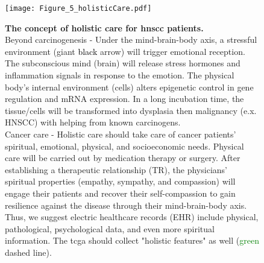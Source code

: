 \documentclass[12pt, a4paper]{article}
\newcommand{\bcaption}[2]{\caption{\textbf{#1} #2}}
\begin{document}
\begin{figure}[hp]
\centering
\texttt{[image: Figure\_5\_holisticCare.pdf]}
\bcaption{The concept of holistic care for \acrshort{hnscc} patients.}
{\\Beyond carcinogenesis - Under the mind-brain-body axis, a stressful environment (giant \textcolor{black}{black} arrow) will trigger emotional reception. The subconscious mind (brain) will release stress hormones and inflammation signals in response to the emotion. The physical body's internal environment (cells) alters epigenetic control in gene regulation and mRNA expression. In a long incubation time, the tissue/cells will be transformed into dysplasia then malignancy (e.x. HNSCC) with helping from known carcinogens.\\
Cancer care - Holistic care should take care of cancer patients' spiritual, emotional, physical, and socioeconomic needs. Physical care will be carried out by medication therapy or surgery. After establishing a therapeutic relationship (TR), the physicians' spiritual properties (empathy, sympathy, and compassion) will engage their patients and recover their self-compassion to gain resilience against the disease through their mind-brain-body axis.
Thus, we suggest electric healthcare records (EHR) include physical, pathological, psychological data, and even more spiritual information. The \acrshort{tcga} should collect "holistic features" as well (\textcolor{green}{green} dashed line).}
\label{fig:figure5}
\end{figure}
\end{document}
